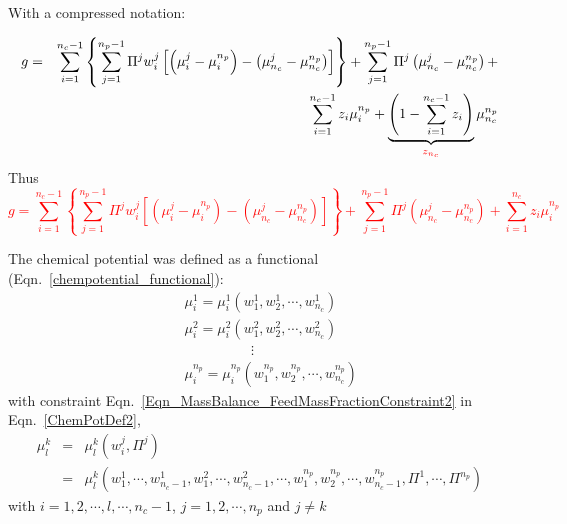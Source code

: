 \documentclass[12pts,a4paper,amsmath,amssymb,floatfix]{article}%
\newcommand{\summation}{\sum\limits}
\newcommand{\red}{\textcolor{red}}
\begin{document}
With a compressed notation:

\begin{eqnarray}
g &=& \summation_{i=1}^{n_{c}-1}\left\{\summation_{j=1}^{n_{p}-1}\Pi^{j}w_{i}^{j}\left[\left(\mu_{i}^{j}-\mu_{i}^{n_{p}}\right) - \left(\mu_{n_{c}}^{j}-\mu_{n_{c}}^{n_{p}}\right)\right]\right\} + \summation_{j=1}^{n_{p}-1}\Pi^{j}\left(\mu_{n_{c}}^{j}-\mu_{n_{c}}^{n_{p}}\right) +  \nonumber \\
&& \hspace{3cm} \summation_{i=1}^{n_{c}-1} z_{i}\mu_{i}^{n_{p}} + \underbrace{\left(1-\summation_{i=1}^{n_{c}-1}z_{i}\right)}_{\red{z_{n_{c}}}}\mu_{n_{c}}^{n_{p}} \nonumber 
\end{eqnarray}
Thus
\red{\begin{equation}
g = \summation_{i=1}^{n_{c}-1}\left\{\summation_{j=1}^{n_{p}-1}\Pi^{j}w_{i}^{j}\left[\left(\mu_{i}^{j}-\mu_{i}^{n_{p}}\right) - \left(\mu_{n_{c}}^{j}-\mu_{n_{c}}^{n_{p}}\right)\right]\right\} + \summation_{j=1}^{n_{p}-1}\Pi^{j}\left(\mu_{n_{c}}^{j}-\mu_{n_{c}}^{n_{p}}\right) + \summation_{i=1}^{n_{c}}z_{i}\mu_{i}^{n_{p}}
\end{equation}}

The chemical potential was defined as a functional (Eqn.~\ref{chempotential_functional}):
\begin{eqnarray}
&& \mu_{i}^{1} = \mu_{i}^{1}\left(w_{1}^{1},w_{2}^{1},\cdots,w_{n_{c}}^{1}\right) \nonumber \\
&& \mu_{i}^{2} = \mu_{i}^{2}\left(w_{1}^{2},w_{2}^{2},\cdots,w_{n_{c}}^{2}\right) \nonumber \\
&& \hspace{2cm}\vdots \nonumber \\
&& \mu_{i}^{n_{p}} = \mu_{i}^{n_{p}}\left(w_{1}^{n_{p}},w_{2}^{n_{p}},\cdots,w_{n_{c}}^{n_{p}}\right) \label{ChemPotDef2}
\end{eqnarray}
with constraint Eqn.~\ref{Eqn_MassBalance_FeedMassFractionConstraint2} in Eqn.~\ref{ChemPotDef2},
\begin{eqnarray}
\mu_{l}^{k} &=& \mu_{l}^{k}\left(w_{i}^{j},\Pi^{j}\right) \nonumber \\
           &=& \mu_{l}^{k}\left(w_{1}^{1},\cdots,w_{n_{c}-1}^{1},w_{1}^{2},\cdots,w_{n_{c}-1}^{2},\cdots,w_{1}^{n_{p}},w_{2}^{n_{p}},\cdots,w_{n_{c}-1}^{n_{p}},\Pi^{1},\cdots,\Pi^{n_{p}}\right)\nonumber
\end{eqnarray}
with $i = 1, 2, \cdots, l, \cdots, n_{c} - 1$, $j = 1, 2, \cdots, n_{p}$ and $j\neq k$
\end{document}
